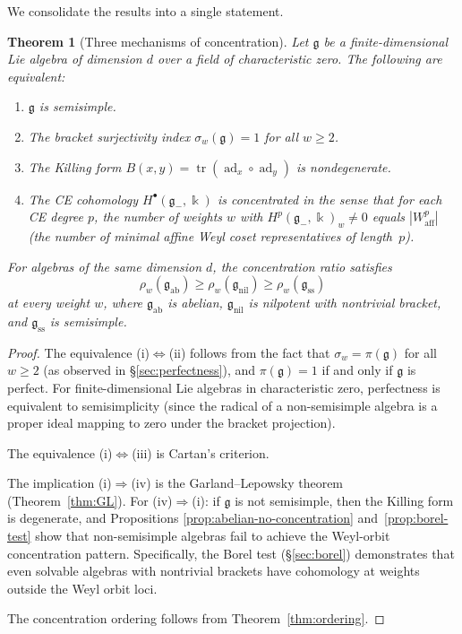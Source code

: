 \documentclass[11pt,reqno]{amsart}
\theoremstyle{plain}
\newtheorem{theorem}{Theorem}[section]
\theoremstyle{definition}
\theoremstyle{remark}
\DeclareMathOperator{\ad}{ad}
\DeclareMathOperator{\tr}{tr}
\newcommand{\fg}{\mathfrak{g}}
\newcommand{\Waff}{W_{\mathrm{aff}}}
\newcommand{\gminus}{\fg_{-}}
\newcommand{\kk}{\Bbbk}
\begin{document}
We consolidate the results into a single statement.

\begin{theorem}[Three mechanisms of concentration]\label{thm:main}
 Let $\fg$ be a finite-dimensional Lie algebra of dimension $d$ over a
 field of characteristic zero. The following are equivalent:
 \begin{enumerate}[label=(\roman*)]
 \item $\fg$ is semisimple.
 \item The bracket surjectivity index $\sigma_w(\fg) = 1$ for all $w \ge 2$.
 \item The Killing form $B(x,y) = \tr(\ad_x \circ \ad_y)$ is nondegenerate.
 \item The CE cohomology $H^\bullet(\gminus, \kk)$ is concentrated in the
 sense that for each CE degree $p$, the number of weights $w$ with
 $H^p(\gminus, \kk)_w \neq 0$ equals $|\Waff^p|$ (the number of
 minimal affine Weyl coset representatives of length~$p$).
 \end{enumerate}
 For algebras of the same dimension $d$, the concentration
 ratio satisfies
 \[
 \rho_w(\fg_{\mathrm{ab}}) \ge \rho_w(\fg_{\mathrm{nil}})
 \ge \rho_w(\fg_{\mathrm{ss}})
 \]
 at every weight $w$, where $\fg_{\mathrm{ab}}$ is abelian,
 $\fg_{\mathrm{nil}}$ is nilpotent with nontrivial bracket, and
 $\fg_{\mathrm{ss}}$ is semisimple.
\end{theorem}

\begin{proof}
 The equivalence (i)$\Leftrightarrow$(ii) follows from the fact that
 $\sigma_w = \pi(\fg)$ for all $w \ge 2$ (as observed in
 \S\ref{sec:perfectness}), and $\pi(\fg) = 1$ if and only if $\fg$ is
 perfect. For finite-dimensional Lie algebras in characteristic zero,
 perfectness is equivalent to semisimplicity (since the radical of a
 non-semisimple algebra is a proper ideal mapping to zero under the
 bracket projection).

 The equivalence (i)$\Leftrightarrow$(iii) is Cartan's criterion.

 The implication (i)$\Rightarrow$(iv) is the Garland--Lepowsky theorem
 (Theorem~\ref{thm:GL}). For (iv)$\Rightarrow$(i): if $\fg$ is not
 semisimple, then the Killing form is degenerate, and Propositions
 \ref{prop:abelian-no-concentration} and~\ref{prop:borel-test}
 show that non-semisimple algebras fail to achieve the Weyl-orbit
 concentration pattern. Specifically, the Borel test
 (\S\ref{sec:borel}) demonstrates that even solvable algebras with
 nontrivial brackets have cohomology at weights outside the Weyl orbit
 loci.

 The concentration ordering follows from Theorem~\ref{thm:ordering}.
\end{proof}
\end{document}
